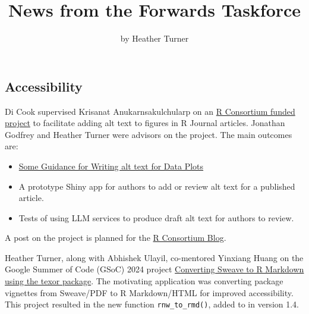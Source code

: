 \title{News from the Forwards Taskforce}


\author{by Heather Turner}

\maketitle


\hypertarget{accessibility}{%
\subsection{Accessibility}\label{accessibility}}

Di Cook supervised Krisanat Anukarnsakulchularp on an
\href{https://r-consortium.org/all-projects/2023-group-2.html\#accessibility-enhancements-for-the-r-journal}{R Consortium funded project}
to facilitate adding alt text to figures in R Journal articles. Jonathan Godfrey
and Heather Turner were advisors on the project. The main outcomes are:

\begin{itemize}
\tightlist
\item
  \href{https://numbats.github.io/alt-text-for-data-plots/}{Some Guidance for Writing alt text for Data Plots}
\item
  A prototype Shiny app for authors to add or review alt text for a published article.
\item
  Tests of using LLM services to produce draft alt text for authors to review.
\end{itemize}

A post on the project is planned for the \href{https://r-consortium.org/blog/}{R Consortium Blog}.

Heather Turner, along with Abhishek Ulayil, co-mentored Yinxiang Huang on the
Google Summer of Code (GSoC) 2024 project \href{https://summerofcode.withgoogle.com/archive/2024/projects/hBLJrIOd}{Converting Sweave to R Markdown using the texor package}.
The motivating application was converting package vignettes from Sweave/PDF to
R Markdown/HTML for improved accessibility. This project resulted in the new
function \texttt{rnw\_to\_rmd()}, added to  in version 1.4.

